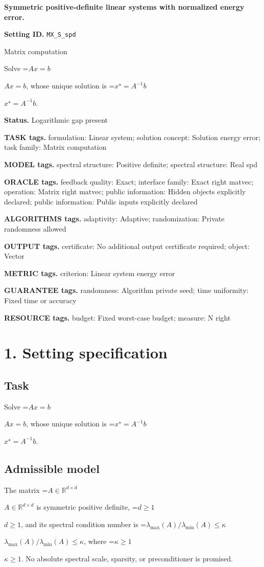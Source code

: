 \documentclass[10pt,a4paper]{article}
\newcommand{\AtlasMath}[1]{\par\begingroup\centering\setbox0=\hbox{$\displaystyle #1$}\ifdim\wd0>1.4\linewidth\typeout{ATLAS WIDE FORMULA: \the\wd0}\fi\ifdim\wd0>\linewidth\resizebox{\linewidth}{!}{\box0}\else\box0\fi\par\endgroup}
\newcommand{\AtlasInlineMath}[1]{\begingroup\setbox0=\hbox{$#1$}\ifdim\wd0>.4\linewidth\endgroup\AtlasMath{#1}\else\endgroup$#1$\fi}
\begin{document}
\raggedright

{\LARGE\bfseries\sffamily\color{AtlasNavy} Symmetric positive-definite linear systems with normalized energy error.\par}\vspace{5pt}
\textbf{Setting ID.} \texttt{MX\_\allowbreak{}S\_\allowbreak{}spd}

Matrix computation

Solve \AtlasInlineMath{Ax=b}, whose unique solution is \AtlasInlineMath{x^\star=A^{-1}b}.

\textbf{Status.} Logarithmic gap present

\textbf{TASK tags.} formulation: Linear system; solution concept: Solution energy error; task family: Matrix computation

\textbf{MODEL tags.} spectral structure: Positive definite; spectral structure: Real spd

\textbf{ORACLE tags.} feedback quality: Exact; interface family: Exact right matvec; operation: Matrix right matvec; public information: Hidden objects explicitly declared; public information: Public inputs explicitly declared

\textbf{ALGORITHMS tags.} adaptivity: Adaptive; randomization: Private randomness allowed

\textbf{OUTPUT tags.} certificate: No additional output certificate required; object: Vector

\textbf{METRIC tags.} criterion: Linear system energy error

\textbf{GUARANTEE tags.} randomness: Algorithm private seed; time uniformity: Fixed time or accuracy

\textbf{RESOURCE tags.} budget: Fixed worst-case budget; measure: N right

\section{1. Setting specification}
\subsection{Task}
Solve \AtlasInlineMath{Ax=b}, whose unique solution is \AtlasInlineMath{x^\star=A^{-1}b}.

\subsection{Admissible model}
The matrix \AtlasInlineMath{A\in\mathbb{R}^{d\times d}} is symmetric positive definite, \AtlasInlineMath{d\ge1}, and its spectral condition number is \AtlasInlineMath{\lambda_{\max}(A)/\lambda_{\min}(A)\le\kappa}, where \AtlasInlineMath{\kappa\ge1}. No absolute spectral scale, sparsity, or preconditioner is promised.
\end{document}
